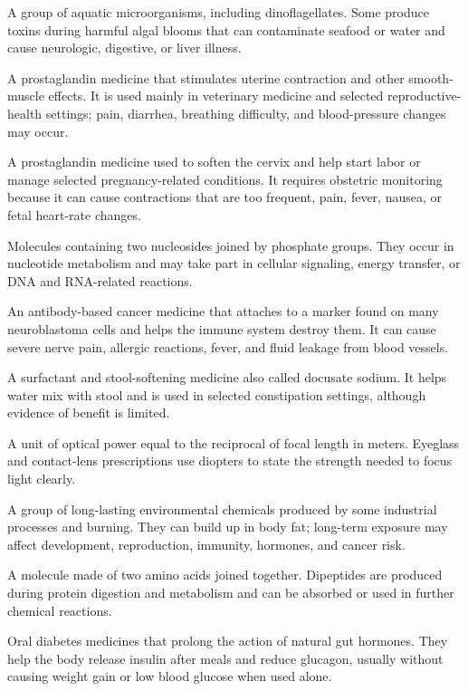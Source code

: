  A group of aquatic microorganisms, including dinoflagellates. Some produce toxins during harmful algal blooms that can contaminate seafood or water and cause neurologic, digestive, or liver illness.

 A prostaglandin medicine that stimulates uterine contraction and other smooth-muscle effects. It is used mainly in veterinary medicine and selected reproductive-health settings; pain, diarrhea, breathing difficulty, and blood-pressure changes may occur.

 A prostaglandin medicine used to soften the cervix and help start labor or manage selected pregnancy-related conditions. It requires obstetric monitoring because it can cause contractions that are too frequent, pain, fever, nausea, or fetal heart-rate changes.

 Molecules containing two nucleosides joined by phosphate groups. They occur in nucleotide metabolism and may take part in cellular signaling, energy transfer, or DNA and RNA-related reactions.

 An antibody-based cancer medicine that attaches to a marker found on many neuroblastoma cells and helps the immune system destroy them. It can cause severe nerve pain, allergic reactions, fever, and fluid leakage from blood vessels.

 A surfactant and stool-softening medicine also called docusate sodium. It helps water mix with stool and is used in selected constipation settings, although evidence of benefit is limited.

 A unit of optical power equal to the reciprocal of focal length in meters. Eyeglass and contact-lens prescriptions use diopters to state the strength needed to focus light clearly.

 A group of long-lasting environmental chemicals produced by some industrial processes and burning. They can build up in body fat; long-term exposure may affect development, reproduction, immunity, hormones, and cancer risk.

 A molecule made of two amino acids joined together. Dipeptides are produced during protein digestion and metabolism and can be absorbed or used in further chemical reactions.

 Oral diabetes medicines that prolong the action of natural gut hormones. They help the body release insulin after meals and reduce glucagon, usually without causing weight gain or low blood glucose when used alone.

